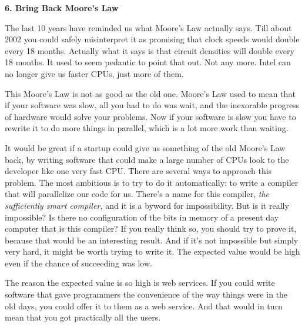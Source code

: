 \textbf{6. Bring Back Moore's Law}

The last 10 years have reminded us what Moore's
                  Law actually says. Till about 2002 you could safely
                  misinterpret it as promising that clock speeds would double
                  every 18 months. Actually what it says is that circuit
                  densities will double every 18 months. It used to seem
                  pedantic to point that out. Not any more. Intel can no longer
                  give us faster CPUs, just more of them.

This
                  Moore's Law is not as good as the old one. Moore's Law used to
                  mean that if your software was slow, all you had to do was
                  wait, and the inexorable progress of hardware would solve your
                  problems. Now if your software is slow you have to rewrite it
                  to do more things in parallel, which is a lot more work than
                  waiting.

It would be great if a startup could give
                  us something of the old Moore's Law back, by writing software
                  that could make a large number of CPUs look to the developer
                  like one very fast CPU. There are several ways to approach
                  this problem. The most ambitious is to try to do it
                  automatically: to write a compiler that will parallelize our
                  code for us. There's a name for this compiler,
                  \emph{the sufficiently smart compiler,} and it is a byword for
                  impossibility. But is it really impossible? Is there no
                  configuration of the bits in memory of a present day computer
                  that is this compiler? If you really think so, you should try
                  to prove it, because that would be an interesting result. And
                  if it's not impossible but simply very hard, it might be worth
                  trying to write it. The expected value would be high even if
                  the chance of succeeding was low.

The reason the
                  expected value is so high is web services. If you could write
                  software that gave programmers the convenience of the way
                  things were in the old days, you could offer it to them as a
                  web service. And that would in turn mean that you got
                  practically all the users.

